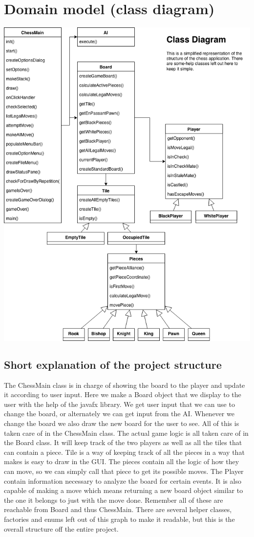 \documentclass{article}
\begin{document}
    \section{Domain model (class diagram)}
    \includegraphics[scale=0.35]{class-diagram.png}
    
    \subsection{Short explanation of the project structure}
    	The ChessMain class is in charge of showing the board to the player and update it according to user input.
	Here we make a Board object that we display to the user with the help of the javafx library.
	We get user input that we can use to change the board, or alternately we can get input from the AI.
	Whenever we change the board we also draw the new board for the user to see. 
	All of this is taken care of in the ChessMain class.
	The actual game logic is all taken care of in the Board class.
	It will keep track of the two players as well as all the tiles that can contain a piece.
	Tile is a way of keeping track of all the pieces in a way that makes is easy to draw in the GUI.
	The pieces contain all the logic of how they can move,
	so we can simply call that piece to get its possible moves.
	The Player contain information necessary to analyze the board for certain events.
	It is also capable of making a move 
	which means returning a new board object similar to the one it belongs to just with the move done.
	Remember all of these are reachable from Board and thus ChessMain.
    There are several helper classes, factories and enums left out of this graph to make it readable, but this is the overall structure off the entire project.
\end{document}

